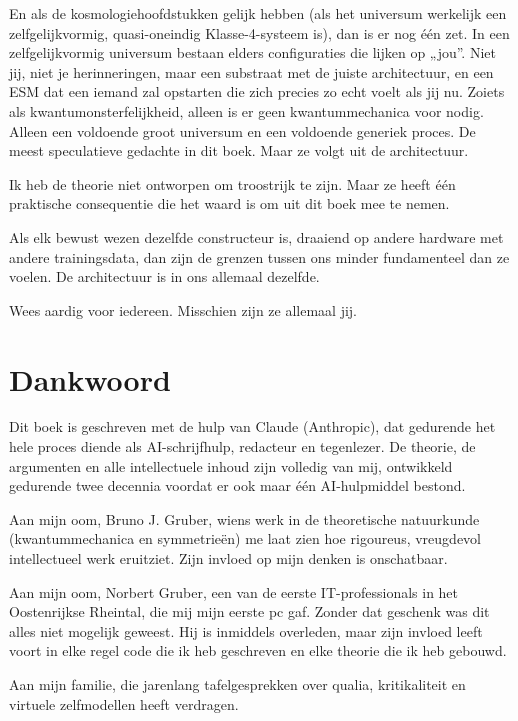 \documentclass[11pt, twoside, openright]{book}
\begin{document}
En als de kosmologiehoofdstukken gelijk hebben (als het universum werkelijk een zelfgelijkvormig, quasi-oneindig Klasse-4-systeem is), dan is er nog één zet. In een zelfgelijkvormig universum bestaan elders configuraties die lijken op „jou”. Niet jij, niet je herinneringen, maar een substraat met de juiste architectuur, en een ESM dat een iemand zal opstarten die zich precies zo echt voelt als jij nu. Zoiets als kwantumonsterfelijkheid, alleen is er geen kwantummechanica voor nodig. Alleen een voldoende groot universum en een voldoende generiek proces. De meest speculatieve gedachte in dit boek. Maar ze volgt uit de architectuur.

Ik heb de theorie niet ontworpen om troostrijk te zijn. Maar ze heeft één praktische consequentie die het waard is om uit dit boek mee te nemen.

Als elk bewust wezen dezelfde constructeur is, draaiend op andere hardware met andere trainingsdata, dan zijn de grenzen tussen ons minder fundamenteel dan ze voelen. De architectuur is in ons allemaal dezelfde.

Wees aardig voor iedereen. Misschien zijn ze allemaal jij.


\chapter*{Dankwoord}

Dit boek is geschreven met de hulp van Claude (Anthropic), dat gedurende het hele proces diende als AI-schrijfhulp, redacteur en tegenlezer. De theorie, de argumenten en alle intellectuele inhoud zijn volledig van mij, ontwikkeld gedurende twee decennia voordat er ook maar één AI-hulpmiddel bestond.

Aan mijn oom, Bruno J. Gruber, wiens werk in de theoretische natuurkunde (kwantummechanica en symmetrieën) me laat zien hoe rigoureus, vreugdevol intellectueel werk eruitziet. Zijn invloed op mijn denken is onschatbaar.

Aan mijn oom, Norbert Gruber, een van de eerste IT-professionals in het Oostenrijkse Rheintal, die mij mijn eerste pc gaf. Zonder dat geschenk was dit alles niet mogelijk geweest. Hij is inmiddels overleden, maar zijn invloed leeft voort in elke regel code die ik heb geschreven en elke theorie die ik heb gebouwd.

Aan mijn familie, die jarenlang tafelgesprekken over qualia, kritikaliteit en virtuele zelfmodellen heeft verdragen.
\end{document}
